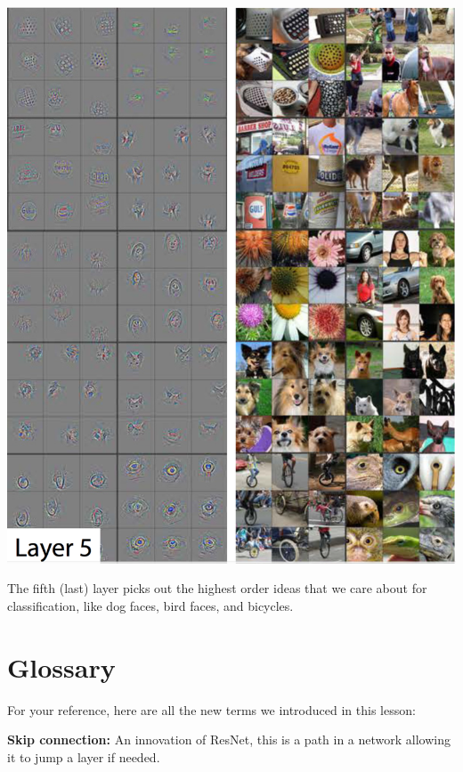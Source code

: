 \includegraphics[width=1\linewidth]{img//cnn//transfer/screen-shot-2016-11-24-at-12.08.11-pm.png}

The fifth (last) layer picks out the highest order ideas that we care about for classification, like dog faces, bird faces, and bicycles.

\section{Glossary}

For your reference, here are all the new terms we introduced in this lesson: \newline

\textbf{Skip connection:} An innovation of ResNet, this is a path in a network allowing it to jump a layer if needed. \newline

